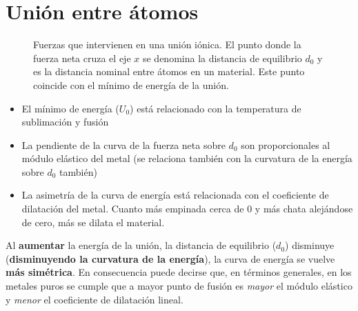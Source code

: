 \section{Unión entre átomos}

\begin{figure}
    \centering
\caption{Fuerzas que intervienen en una unión iónica. El punto donde la fuerza neta cruza el eje $x$ se denomina la distancia de equilibrio $d_0$ y es la distancia nominal entre átomos en un material. Este punto coincide con el mínimo de energía de la unión.}
\end{figure}

\begin{itemize}
    \item El mínimo de energía ($U_0$) está relacionado con la temperatura de sublimación y fusión
    \item La pendiente de la curva de la fuerza neta sobre $d_0$ son proporcionales al módulo elástico del metal (se relaciona también con la curvatura de la energía sobre $d_0$ también)
    \item La asimetría de la curva de energía está relacionada con el coeficiente de dilatación del metal. Cuanto más empinada cerca de 0 y más chata alejándose de cero, más se dilata el material.
\end{itemize}



Al \textbf{aumentar} la energía de la unión, la distancia de equilibrio ($d_0$) disminuye (\textbf{disminuyendo la curvatura de la energía}), la curva de energía se vuelve \textbf{más simétrica}. En consecuencia puede decirse que, en términos generales, en los metales puros se cumple que a mayor punto de fusión es \textit{mayor} el módulo elástico y \textit{menor} el coeficiente de dilatación lineal.

